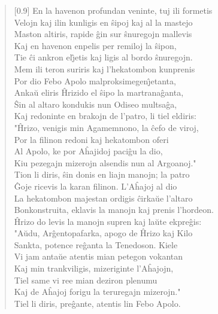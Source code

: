 \begin{verse}[0.9\textwidth]
          En la havenon profundan veninte, tuj ili formetis\\
          Velojn kaj ilin kunligis en \^sipoj kaj al la mastejo\\
          Maston altiris, rapide \^gin sur \^snuregojn mallevis\\
          Kaj en havenon enpelis per remiloj la \^sipon,\\
          Tie \^ci ankron el\^{\j}etis kaj ligis al bordo \^snuregojn.\\
          Mem ili teron suriris kaj l'hekatombon kunprenis\\
          Por dio Febo Apolo malproksimegen\^{\j}etanta,\\
          Anka\u u eliris \^Hrizido el \^sipo la martrana\^ganta,\\
          \^Sin al altaro kondukis nun Odiseo multsa\^ga,\\
          Kaj redoninte en brakojn de l'patro, li tiel eldiris:\\
          \vin   "\^Hrizo, venigis min Agamemnono, la \^cefo de viroj,\\
          Por la filinon redoni kaj hekatombon oferi\\
          Al Apolo, ke por A\^hajidoj paci\^gu la dio,\\
          Kiu pezegajn mizerojn alsendis nun al Argoanoj."\\
          \vin   Tion li diris, \^sin donis en liajn manojn; la patro\\
          \^Goje ricevis la karan filinon. L'A\^hajoj al dio\\
          La hekatombon majestan ordigis \^cirka\u ue l'altaro\\
          Bonkonstruita, eklavis la manojn kaj prenis l'hordeon.\\
          \^Hrizo do levis la manojn supren kaj la\u ute ekpre\^gis:\\
          \vin   "A\u udu, Ar\^gentopafarka, apogo de \^Hrizo kaj Kilo\\
          Sankta, potence re\^ganta la Tenedoson. Kiele\\
          Vi jam anta\u ue atentis mian petegon vokantan\\
          Kaj min trankviligis, mizeriginte l'A\^hajojn,\\
          Tiel same vi ree mian deziron plenumu\\
          Kaj de A\^hajoj forigu la teruregajn mizerojn."\\
           \vin  Tiel li diris, pre\^gante, atentis lin Febo Apolo.\\

\end{verse}
